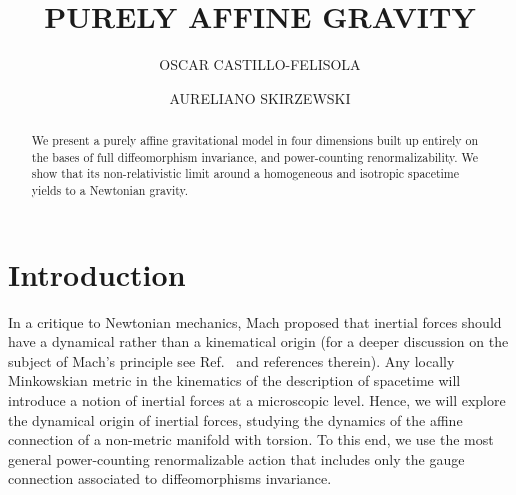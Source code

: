 \documentclass{ws-mpla}
\renewcommand{\(}{\left(}
\renewcommand{\)}{\right)}
\renewcommand{\[}{\left[}
\renewcommand{\]}{\right]}
\newcommand\UTFSM{Departamento de F\'\i sica, Universidad T\'{e}cnica Federico Santa Mar\'\i a, \\ Casilla 110-V, Valpara\'\i so, Chile}
\newcommand\CCTVal{Centro Cient\'\i fico Tecnol\'ogico de Valpara\'\i so, \\ Casilla 110-V, Valpara\'\i so, Chile}
\newcommand\CFF{Centro de F\'\i sica Fundamental,  Universidad de los Andes,\\ 5101 M\'erida, Venezuela}
\begin{document}


\catchline{}{}{}{}{}

\title{PURELY AFFINE GRAVITY}



\author{OSCAR {CASTILLO-FELISOLA}}
\address{\CCTVal, and \\ \UTFSM.}

\author{AURELIANO {SKIRZEWSKI}}
\address{\CFF.}

\maketitle
{}

\begin{abstract}
  We present a purely affine gravitational model in four dimensions built up entirely on the bases of full diffeomorphism invariance, and power-counting renormalizability. We show that its non-relativistic limit around a homogeneous and isotropic spacetime yields to a Newtonian gravity.
\end{abstract}







\section{Introduction}

In a critique to Newtonian mechanics, Mach proposed that inertial forces should have a dynamical rather than a kinematical origin (for a deeper discussion on the subject of Mach's principle see Ref.~ and references therein).  Any locally Minkowskian metric in the kinematics of the description of spacetime will introduce a notion of inertial forces at a microscopic level.\cite{Sciama:1964wt} Hence, we will explore the dynamical origin of inertial forces, studying the dynamics of the affine connection of a non-metric manifold with torsion. To this end, we use the most general power-counting renormalizable action that includes only the gauge connection associated to diffeomorphisms invariance.
\end{document}
